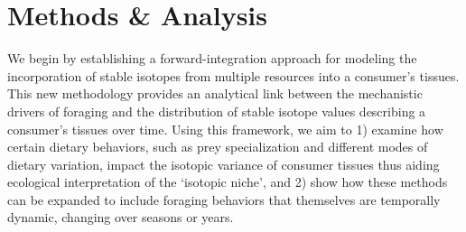 \documentclass{frontiersSCNS}
\begin{document}







\section{Methods \& Analysis}
We begin by establishing a forward-integration approach for modeling the incorporation of stable isotopes from multiple resources into a consumer's tissues.
This new methodology provides an analytical link between the mechanistic drivers of foraging and the distribution of stable isotope values describing a consumer's tissues over time.
Using this framework, we aim to
1) examine how certain dietary behaviors, such as prey specialization and different modes of dietary variation, impact the isotopic variance of consumer tissues thus aiding ecological interpretation of the `isotopic niche', and
2) show how these methods can be expanded to include foraging behaviors that themselves are temporally dynamic, changing over seasons or years.
\end{document}
